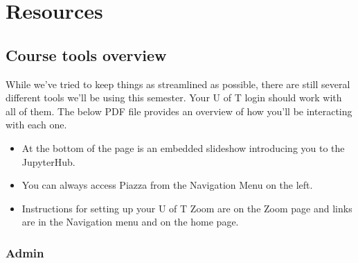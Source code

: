 \documentclass[
  openany]{book}
\providecommand{\tightlist}{%
  \setlength{\itemsep}{0pt}\setlength{\parskip}{0pt}}
\begin{document}
\hypertarget{resources}{%
\chapter{Resources}\label{resources}}

\hypertarget{course-tools-overview}{%
\section{Course tools overview}\label{course-tools-overview}}

While we've tried to keep things as streamlined as possible, there are still several different tools we'll be using this semester. Your U of T login should work with all of them. The below PDF file provides an overview of how you'll be interacting with each one.

\begin{itemize}
\tightlist
\item
  At the bottom of the page is an embedded slideshow introducing you to the JupyterHub.\\
\item
  You can always access Piazza from the Navigation Menu on the left.\\
\item
  Instructions for setting up your U of T Zoom are on the Zoom page and links are in the Navigation menu and on the home page.
\end{itemize}

\hypertarget{admin}{%
\subsection{Admin}\label{admin}}
\end{document}
